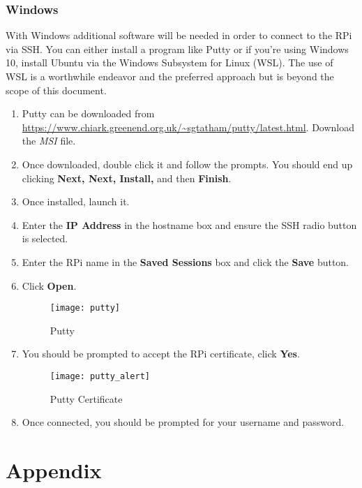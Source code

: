 \documentclass[
a4paper,
fontsize=14pt, %
pagesize, %
parskip=half-, %
]{scrartcl} %
\theoremstyle{mythmstyle} %
\begin{document}
\subsubsection{Windows}
With Windows additional software will be needed in order to connect to the RPi via SSH.  You can either install a program like Putty or if you're using Windows 10, install Ubuntu via the Windows Subsystem for Linux (WSL). The use of WSL is a worthwhile endeavor and the preferred approach but is beyond the scope of this document.
\begin{enumerate}
    \item Putty can be downloaded from \url{https://www.chiark.greenend.org.uk/~sgtatham/putty/latest.html}.  Download the \emph{MSI} file.
    \item Once downloaded, double click it and follow the prompts.  You should end up clicking \textbf{Next, Next, Install,} and then \textbf{Finish}.
    \item Once installed, launch it.
    \item Enter the \textbf{IP Address} in the hostname box and ensure the SSH radio button is selected.
    \item Enter the RPi name in the \textbf{Saved Sessions} box and click the \textbf{Save} button.
    \item Click \textbf{Open}.
    \begin{figure}[h]
        \centering\texttt{[image: putty]}
        \caption{Putty}
    \end{figure}
    \clearpage
    \item You should be prompted to accept the RPi certificate, click \textbf{Yes}.
    \begin{figure}[h]
        \centering\texttt{[image: putty\_alert]}
        \caption{Putty Certificate}
    \end{figure}
    \item Once connected, you should be prompted for your username and password.
\end{enumerate}



\clearpage
\section{Appendix}
\end{document}
